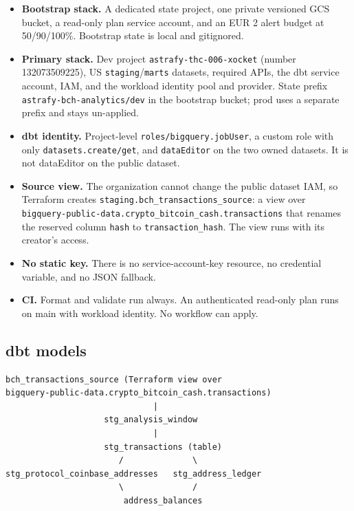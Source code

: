 \documentclass[10pt,a4paper]{article}
\newcommand{\code}[1]{\nolinkurl{#1}}
\begin{document}
\begin{itemize}
  \item \textbf{Bootstrap stack.} A dedicated state project, one private
        versioned GCS bucket, a read-only plan service account, and an
        EUR 2 alert budget at 50/90/100\%. Bootstrap state is local and
        gitignored.
  \item \textbf{Primary stack.} Dev project
        \code{astrafy-thc-006-xocket} (number 132073509225), US
        \code{staging}/\code{marts} datasets, required APIs, the dbt
        service account, IAM, and the workload identity pool and
        provider. State prefix \code{astrafy-bch-analytics/dev} in the
        bootstrap bucket; prod uses a separate prefix and stays
        un-applied.
  \item \textbf{dbt identity.} Project-level
        \code{roles/bigquery.jobUser}, a custom role with only
        \code{datasets.create/get}, and \code{dataEditor} on the two
        owned datasets. It is not dataEditor on the public dataset.
  \item \textbf{Source view.} The organization cannot change the public
        dataset IAM, so Terraform creates
        \code{staging.bch_transactions_source}: a view over
        \code{bigquery-public-data.crypto_bitcoin_cash.transactions}
        that renames the reserved column \code{hash} to
        \code{transaction_hash}. The view runs with its creator's
        access.
  \item \textbf{No static key.} There is no service-account-key
        resource, no credential variable, and no JSON fallback.
  \item \textbf{CI.} Format and validate run always. An authenticated
        read-only plan runs on main with workload identity. No workflow
        can apply.
\end{itemize}

\subsection{dbt models}

\begin{verbatim}
bch_transactions_source (Terraform view over
bigquery-public-data.crypto_bitcoin_cash.transactions)
                              |
                    stg_analysis_window
                              |
                    stg_transactions (table)
                       /              \
stg_protocol_coinbase_addresses   stg_address_ledger
                       \              /
                        address_balances
\end{verbatim}
\end{document}
